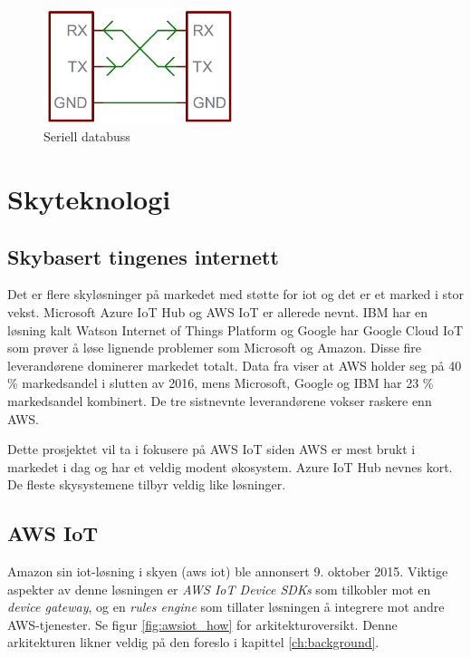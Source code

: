 \begin{figure}
\includegraphics[width=0.5\textwidth,center]{fig/serial}
\caption{Seriell databuss \citep{spark_serial}}
\label{fig:serial}
\end{figure}

\section{Skyteknologi}

\subsection{Skybasert tingenes internett}
Det er flere skyløsninger på markedet med støtte for \gls{iot} og det er et marked i stor vekst.
Microsoft Azure IoT Hub og AWS IoT er allerede nevnt. IBM har en løsning kalt Watson Internet of Things Platform og
Google har Google Cloud IoT
som prøver å løse lignende problemer som Microsoft og Amazon.
Disse fire leverandørene dominerer markedet totalt. Data fra \citet{srg_cloud}
viser at AWS holder seg på 40 \% markedsandel i slutten av 2016, mens Microsoft,
Google og IBM har 23 \% markedsandel kombinert. De tre sistnevnte leverandørene vokser raskere enn AWS.

Dette prosjektet vil ta i fokusere på AWS IoT siden AWS er mest brukt i markedet i dag
og har et veldig modent økosystem. Azure IoT Hub nevnes kort. De fleste skysystemene tilbyr veldig like
løsninger.

\subsection{AWS IoT}
\label{sec:aws_iot}
Amazon sin \gls{iot}-løsning i skyen (\gls{aws} \gls{iot}) ble annonsert 9. oktober 2015.
Viktige aspekter av denne løsningen er \textit{AWS IoT Device SDKs} som tilkobler mot 
en \textit{device gateway}, og en \textit{rules engine} som tillater løsningen å integrere
mot andre AWS-tjenester. Se figur \ref{fig:awsiot_how} for arkitekturoversikt.
Denne arkitekturen likner veldig på den \citet{iot_harvard_smart} foreslo i kapittel \ref{ch:background}.

